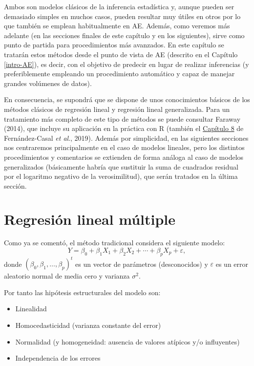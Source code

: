 \documentclass[
]{book}
\theoremstyle{break}
\theoremstyle{definition}
\theoremstyle{definition}
\theoremstyle{definition}
\theoremstyle{definition}
\theoremstyle{remark}
\begin{document}
Ambos son modelos clásicos de la inferencia estadística y, aunque pueden ser demasiado simples en muchos casos, pueden resultar muy útiles en otros por lo que también se emplean habitualmente en AE.
Además, como veremos más adelante (en las secciones finales de este capítulo y en los siguientes), sirve como punto de partida para procedimientos más avanzados.
En este capítulo se tratarán estos métodos desde el punto de vista de AE (descrito en el Capítulo \ref{intro-AE}), es decir, con el objetivo de predecir en lugar de realizar inferencias (y preferiblemente empleando un procedimiento automático y capaz de manejar grandes volúmenes de datos).

En consecuencia, se supondrá que se dispone de unos conocimientos básicos de los métodos clásicos de regresión lineal y regresión lineal generalizada.
Para un tratamiento más completo de este tipo de métodos se puede consultar Faraway (2014), que incluye su aplicación en la práctica con R (también el \href{https://rubenfcasal.github.io/intror/modelos-lineales.html}{Capítulo 8} de Fernández-Casal \emph{et al}., 2019).
Además por simplicidad, en las siguientes secciones nos centraremos principalmente en el caso de modelos lineales, pero los distintos procedimientos y comentarios se extienden de forma análoga al caso de modelos generalizados (básicamente habría que sustituir la suma de cuadrados residual por el logaritmo negativo de la verosimilitud), que serán tratados en la última sección.

\hypertarget{reg-multiple}{%
\section{Regresión lineal múltiple}\label{reg-multiple}}

Como ya se comentó, el método tradicional considera el siguiente modelo:
\begin{equation} 
  Y = \beta_{0}+\beta_{1}X_{1}+\beta_{2}X_{2}+\cdots+\beta_{p}X_{p} + \varepsilon,
  \label{eq:modelo-rlm}
\end{equation}
donde \(\left( \beta_{0},\beta_{1},\ldots,\beta_{p}\right)^t\) es un vector de parámetros (desconocidos) y \(\varepsilon\) es un error aleatorio normal de media cero y varianza \(\sigma^2\).

Por tanto las hipótesis estructurales del modelo son:

\begin{itemize}
\item
  Linealidad
\item
  Homocedasticidad (varianza constante del error)
\item
  Normalidad (y homogeneidad: ausencia de valores atípicos y/o influyentes)
\item
  Independencia de los errores
\end{itemize}
\end{document}
